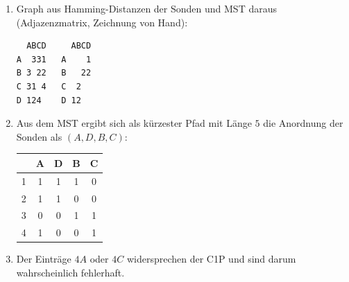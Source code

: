 \documentclass{homework}
\begin{document}
\begin{enumerate}
\begin{enumerate}

\item Graph aus Hamming-Distanzen der Sonden und MST daraus (Adjazenzmatrix, Zeichnung von Hand):
\begin{verbatim}
  ABCD     ABCD
A  331   A    1
B 3 22   B   22
C 31 4   C  2
D 124    D 12
\end{verbatim}

\item Aus dem MST ergibt sich als kürzester Pfad mit Länge $5$ die Anordnung der Sonden als $(A,D,B,C)$:

\begin{tabular}{l|cccc}
	& A	& D	& B	& C\\\hline
1	& 1	& 1	& 1	& 0\\
2	& 1	& 1	& 0	& 0\\
3	& 0	& 0	& 1	& 1\\
4	& 1	& 0	& 0	& 1
\end{tabular}

\item Der Einträge $4A$ oder $4C$ widersprechen der C1P und sind darum wahrscheinlich fehlerhaft.

\end{enumerate}

\end{enumerate}
\end{document}
